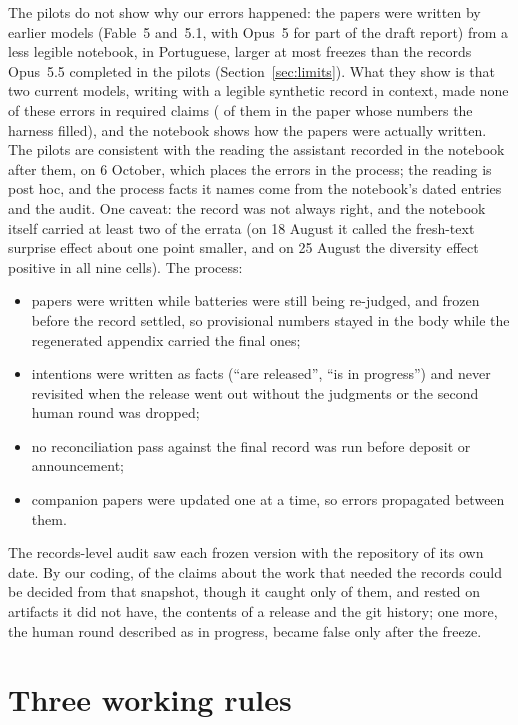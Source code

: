 \documentclass[11pt]{article}
\begin{document}
The pilots do not show why our errors happened: the papers were written by earlier models (Fable~5 and~5.1, with Opus~5 for part of the
draft report) from a less legible notebook, in Portuguese, larger at most freezes than the records Opus~5.5 completed in the pilots
(Section~\ref{sec:limits}). What they show is that two current models, writing with a legible synthetic record in context, made none of these errors in
\PilotFacts{} required claims (\PilotFactsHarness{} of them in the paper whose numbers the harness filled), and the notebook shows how
the papers were actually written. The pilots are consistent with the reading the assistant recorded in the notebook after them, on 6 October,
which places the errors in the process; the reading is post hoc, and the process facts it names come from the notebook's dated
entries and the audit. One caveat: the record was not always right, and the notebook itself carried
at least two of the errata (on 18 August it called the fresh-text surprise effect about one point smaller, and on 25 August the
diversity effect positive in all nine cells). The process:
\begin{itemize}\setlength\itemsep{0pt}
\item papers were written while batteries were still being re-judged, and frozen before the record settled, so provisional
numbers stayed in the body while the regenerated appendix carried the final ones;
\item intentions were written as facts (``are released'', ``is in progress'') and never revisited when the release went out
without the judgments or the second human round was dropped;
\item no reconciliation pass against the final record was run before deposit or announcement;
\item companion papers were updated one at a time, so errors propagated between them.
\end{itemize}
The records-level audit saw each frozen version with the repository of its own date. By our coding, \WorkRecSnap{} of the
\NworkClaimsRec{} claims about the work that needed the records could be decided from that snapshot, though it caught only \WorkRecSnapCtwo{} of
them, and \WorkRecNoSnap{} rested on
artifacts it did not have, the contents of a release and the git history; one more, the human round described as in progress, became
false only after the freeze.

\section{Three working rules}
\end{document}
